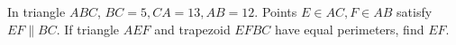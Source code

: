 In triangle $ABC$, $BC=5,CA=13,AB=12$. Points $E\in AC,F\in AB$ satisfy $EF\parallel BC$. If triangle $AEF$ and trapezoid $EFBC$ have equal perimeters, find $EF$.
